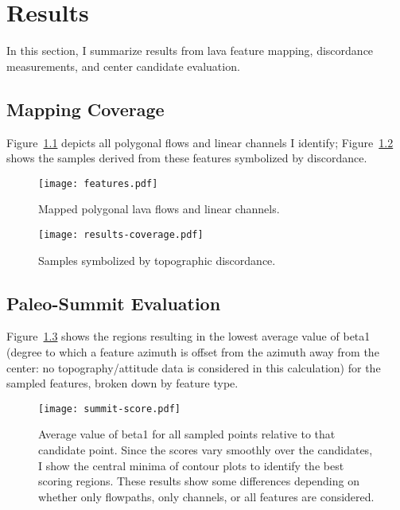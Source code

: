 \chapter{Results}

In this section, I summarize results from lava feature mapping, discordance measurements, and center candidate evaluation. 

\section{Mapping Coverage}

Figure~\ref{fig:features} depicts all polygonal flows and linear channels I identify; Figure~\ref{fig:results-coverage} shows the samples derived from these features symbolized by discordance.

\begin{figure}
    \texttt{[image: features.pdf]}%
    \caption[Mapped lava features]{Mapped polygonal lava flows and linear channels.}%
    \label{fig:features}
\end{figure}

\begin{figure}
    \texttt{[image: results-coverage.pdf]}%
    \caption[Mapped topographic discordance]{Samples symbolized by topographic discordance.}%
    \label{fig:results-coverage}
\end{figure}

\section{Paleo-Summit Evaluation}

Figure~\ref{fig:summit-score} shows the regions resulting in the lowest average value of \acs{beta1} (degree to which a feature azimuth is offset from the azimuth away from the center: no topography/attitude data is considered in this calculation) for the sampled features, broken down by feature type.

\begin{figure}
    \texttt{[image: summit-score.pdf]}%
    \caption[Paleo-summit evaluation]{Average value of \acs{beta1} for all sampled points relative to that candidate point. Since the scores vary smoothly over the candidates, I show the central minima of contour plots to identify the best scoring regions. These results show some differences depending on whether only flowpaths, only channels, or all features are considered.}%
    \label{fig:summit-score}
\end{figure}

